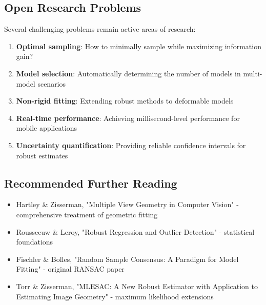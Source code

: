\documentclass[12pt]{article}
\theoremstyle{definition}
\begin{document}
\subsection{Open Research Problems}

Several challenging problems remain active areas of research:

\begin{enumerate}
    \item \textbf{Optimal sampling}: How to minimally sample while maximizing information gain?
    \item \textbf{Model selection}: Automatically determining the number of models in multi-model scenarios
    \item \textbf{Non-rigid fitting}: Extending robust methods to deformable models
    \item \textbf{Real-time performance}: Achieving millisecond-level performance for mobile applications
    \item \textbf{Uncertainty quantification}: Providing reliable confidence intervals for robust estimates
\end{enumerate}

\subsection{Recommended Further Reading}

\begin{itemize}
    \item Hartley \& Zisserman, "Multiple View Geometry in Computer Vision" - comprehensive treatment of geometric fitting
    \item Rousseeuw \& Leroy, "Robust Regression and Outlier Detection" - statistical foundations
    \item Fischler \& Bolles, "Random Sample Consensus: A Paradigm for Model Fitting" - original RANSAC paper
    \item Torr \& Zisserman, "MLESAC: A New Robust Estimator with Application to Estimating Image Geometry" - maximum likelihood extensions
\end{itemize}
\end{document}
